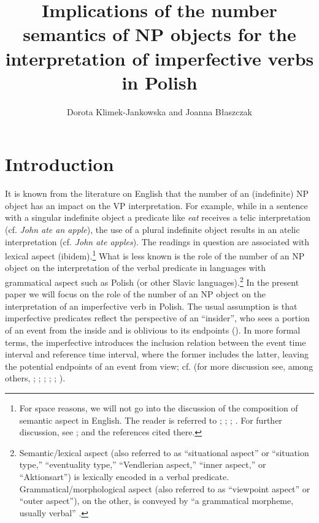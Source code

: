 \documentclass[output=paper]{langscibook}
\author{Dorota Klimek-Jankowska\affiliation{University of Wrocław} and Joanna Błaszczak\affiliation{University of Wrocław}}
\title[Number semantics and the interpretation of imperfective verbs in Polish]{Implications of the number semantics of NP objects for the interpretation of imperfective verbs in Polish}
\begin{document}
\maketitle

\section{Introduction}\label{jan-bla:fansb:kb:sec1}

It is known from the literature on English that the number of an (indefinite) NP object has an impact on the VP interpretation. For example, while in a sentence with a singular indefinite object a predicate like \textit{eat} receives a telic interpretation (cf. \textit{John ate an apple}), the use of a plural indefinite object results in an atelic interpretation (cf. \textit{John ate apples}). The readings in question are associated with lexical aspect (ibidem).\footnote{For space reasons, we will not go into the discussion of the composition of semantic aspect in English. The reader is referred to \citet{Filip1994}; \citet{Krifka1989,Krifka1992,Krifka1998}; \citet{Rothstein2004}; \citet{Verkuyl1972,Verkuyl1993,Verkuyl1999}. For further discussion, see \citet{Dowty1979,MacDonald2008,Tenny1994,Willim2006}; and the references cited there.} What is less known is the role of the number of an NP object on the interpretation of the verbal predicate in languages with grammatical aspect such as Polish (or other Slavic languages).\footnote{Semantic/lexical aspect (also referred to as “situational aspect” or “situation type,” “eventuality type,” “Vendlerian aspect,” “inner aspect,” or “Aktionsart”) is lexically encoded in a verbal predicate. Grammatical/morphological aspect (also referred to as “viewpoint aspect” or “outer aspect”), on the other, is conveyed by “a grammatical morpheme, usually verbal” \citep[2]{Smith1997}.} In the present paper we will focus on the role of the number of an NP object on the interpretation of an imperfective verb in Polish. The usual assumption is that imperfective predicates reflect the perspective of an ``insider'', who sees a portion of an event from the inside and is oblivious to its endpoints (\citealt{KazaninaandPhillips2003}). In more formal terms, the imperfective introduces the inclusion relation between the event time interval and reference time interval, where the former includes the latter, leaving the potential endpoints of an event from view; cf.  (for more discussion see, among others, \citealt{Borik20022006}; \citealt{Comrie1976}; \citealt{KampandReyle1993}; \citealt{Klein1994}; \citealt{Reichenbach1947}; \citealt{Smith1997}).
\end{document}

